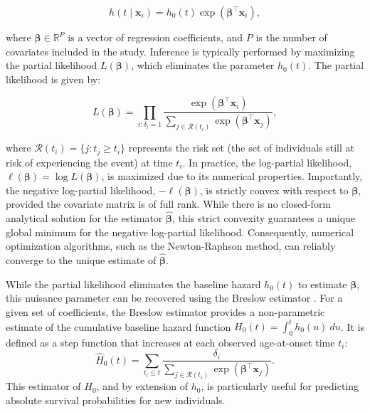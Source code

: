 \begin{equation}
    h(t \mid \bm{x}_i) = h_0(t) \exp(\bm{\beta}^\top \bm{x}_i),
\end{equation}

where $\bm{\beta} \in \mathbb{R}^P$ is a vector of regression coefficients, and $P$ is the number of covariates included in the study. Inference is typically performed by maximizing the partial likelihood $L(\bm{\beta})$, which eliminates the parameter $h_0(t)$. The partial likelihood is given by:

\begin{equation}
    L(\bm{\beta}) = \prod_{i: \delta_i = 1} \frac{\exp(\bm{\beta}^\top \bm{x}_i)}{\sum_{j \in \mathcal{R}(t_i)} \exp(\bm{\beta}^\top \bm{x}_j)},
\end{equation}

where $\mathcal{R}(t_i) = \{j : t_j \ge t_i\}$ represents the risk set (the set of individuals still at risk of experiencing the event) at time $t_i$. In practice, the log-partial likelihood, $\ell(\bm{\beta}) = \log L(\bm{\beta})$, is maximized due to its numerical properties. Importantly, the negative log-partial likelihood, $-\ell(\bm{\beta})$, is strictly convex with respect to $\bm{\beta}$, provided the covariate matrix is of full rank. While there is no closed-form analytical solution for the estimator $\hat{\bm{\beta}}$, this strict convexity guarantees a unique global minimum for the negative log-partial likelihood. Consequently, numerical optimization algorithms, such as the Newton-Raphson method, can reliably converge to the unique estimate of $\hat{\bm{\beta}}$.

While the partial likelihood eliminates the baseline hazard $h_0(t)$ to estimate $\bm{\beta}$, this nuisance parameter can be recovered using the Breslow estimator \cite{Breslow1974CovarianceAO}. For a given set of coefficients, the Breslow estimator provides a non-parametric estimate of the cumulative baseline hazard function $H_0(t) = \int_0^t h_0(u) \ du$. It is defined as a step function that increases at each observed age-at-onset time $t_i$:
\begin{equation}
    \hat{H}_0(t) = \sum_{t_i \le t} \frac{\delta_i}{\sum_{j \in \mathcal{R}(t_i)} \exp(\bm{\beta}^\top \bm{x}_j)}.
\end{equation}
This estimator of $H_0$, and by extension of $h_0$, is particularly useful for predicting absolute survival probabilities for new individuals. 

